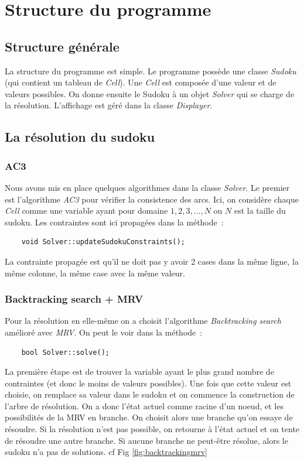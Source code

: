 \documentclass{article}
\begin{document}
\section{Structure du programme}
\subsection{Structure générale}

La structure du programme est simple. Le programme possède une classe \emph{Sudoku} (qui contient un tableau de \emph{Cell}). Une \emph{Cell} est composée d'une valeur et de valeurs possibles. On donne ensuite le Sudoku à un objet \emph{Solver} qui se charge de la résolution. L'affichage est géré dans la classe \emph{Displayer}.

\subsection{La résolution du sudoku}

\subsubsection{AC3}

Nous avons mis en place quelques algorithmes dans la classe \emph{Solver}. Le premier est l'algorithme \emph{AC3} pour vérifier la consistence des arcs. Ici, on considère chaque \emph{Cell} comme une variable ayant pour domaine ${1,2,3,...,N}$ ou $N$ est la taille du sudoku. Les contraintes sont ici propagées dans la méthode~:

\begin{verbatim}
	void Solver::updateSudokuConstraints();
\end{verbatim}

La contrainte propagée est qu'il ne doit pas y avoir 2 cases dans la même ligne, la même colonne, la même case avec la même valeur.

\subsubsection{Backtracking search + MRV}

Pour la résolution en elle-même on a choisit l'algorithme \emph{Backtracking search} amélioré avec \emph{MRV}. On peut le voir dans la méthode~:
\begin{verbatim}
	bool Solver::solve();
\end{verbatim}

La première étape est de trouver la variable ayant le plus grand nombre de contraintes (et donc le moins de valeurs possibles). Une fois que cette valeur est choisie, on remplace sa valeur dans le sudoku et on commence la construction de l'arbre de résolution. On a donc l'état actuel comme racine d'un noeud, et les possibilités de la MRV en branche. On choisit alors une branche qu'on essaye de résoudre. Si la résolution n'est pas possible, on retourne à l'état actuel et on tente de résoudre une autre branche. Si aucune branche ne peut-être résolue, alors le sudoku n'a pas de solutions. cf Fig \ref{fig:backtrackingmrv}
\end{document}

